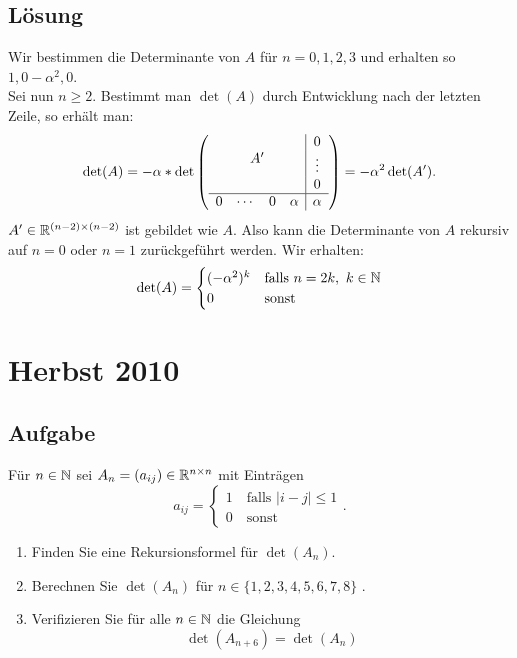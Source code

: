 \subsection{Lösung}
Wir bestimmen die Determinante von \( A \) für \( n = 0, 1, 2, 3 \) und erhalten so \( 1, 0 -\alpha^2, 0 \).
\\
Sei nun \( n \geq 2 \). Bestimmt man \( \det(A) \) durch Entwicklung nach der letzten Zeile, so erhält man:
\begin{equation*}
	\det(A) = -\alpha * \det \left( 
	\begin{array}{cccc|c}
		\multicolumn{4}{c|}{\multirow{3}{*}{\( A' \)}} & 0 \\
		\multicolumn{4}{c|}{} & \vdots \\
		\multicolumn{4}{c|}{} & 0 \\
		\hline 
		0 & \cdots & 0 & \alpha & \alpha
	\end{array}
	 \right) = -\alpha^2\det(A')\text{.}
\end{equation*}
\( A' \in \mathbb{R}^{(n-2) \times (n-2)} \) ist gebildet wie \( A \). Also kann die Determinante von \( A \) rekursiv auf \( n = 0 \) oder \( n = 1 \) zurückgeführt werden. Wir erhalten:
\begin{equation*}
	\det(A) = \begin{cases}
		(-\alpha^2)^k &\text{falls } n = 2k, \ k \in \mathbb{N} \\
		0 &\text{sonst}
	\end{cases}
\end{equation*}

\newpage

\section{Herbst 2010}

\subsection{Aufgabe}
Für \( n \in \mathbb{N} \) sei \( A_n = (a_{ij}) \in \mathbb{R}^{n \times n} \) mit Einträgen
\begin{equation*}
	 a_{ij} = \begin{cases}
	 	1 \quad \text{falls } |i - j| \leq 1 \\
	 	0 \quad \text{sonst}
	 \end{cases}\text{.}
\end{equation*}
\begin{enumerate}
	\item Finden Sie eine Rekursionsformel für \( \det(A_n) \).
	\item Berechnen Sie \( \det(A_n) \) für \( n \in \{ 1, 2, 3, 4, 5, 6, 7, 8 \} \) .
	\item Verifizieren Sie für alle \( n \in \mathbb{N} \) die Gleichung
	\begin{equation*}
		\det(A_{n+6}) = \det(A_n) 
	\end{equation*}
\end{enumerate}

